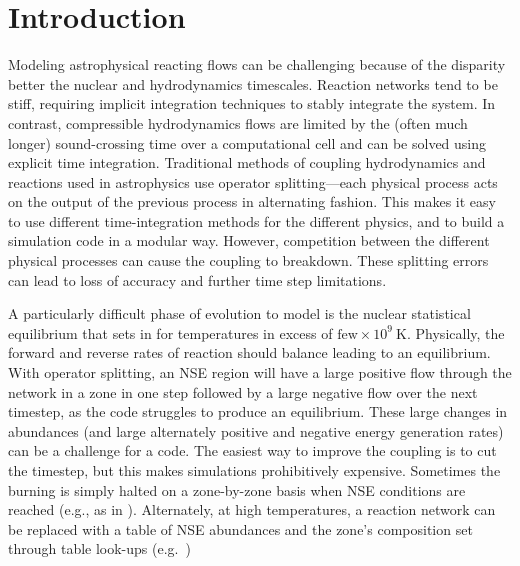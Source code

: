 \documentclass[times,modern]{aastex63}
\newcommand{\MarginPar}[1]{\marginpar{\vskip-\baselineskip\raggedright\tiny\sffamily\hrule\smallskip{\color{red}#1}\par\smallskip\hrule}}
\begin{document}
\section{Introduction}\label{Sec:Introduction}

Modeling astrophysical reacting flows can be challenging because of
the disparity better the nuclear and hydrodynamics timescales.
Reaction networks tend to be stiff, requiring implicit integration
techniques to stably integrate the system.  In contrast, compressible
hydrodynamics flows are limited by the (often much longer)
sound-crossing time over a computational cell and can be solved using
explicit time integration. Traditional methods of coupling
hydrodynamics and reactions used in astrophysics use operator
splitting---each physical process acts on the output of the previous
process in alternating fashion.  This makes it easy to use different
time-integration methods for the different physics, and to build a
simulation code in a modular way.  However, competition between the
different physical processes can cause the coupling to breakdown.
These splitting errors can lead to loss of accuracy and further time
step limitations.

A particularly difficult phase of evolution to model is the nuclear
statistical equilibrium that sets in for
temperatures in excess of $\mbox{few} \times 10^9~\mathrm{K}$.  Physically, the
forward and reverse rates of reaction should balance leading to an equilibrium.
With operator splitting, an NSE region will have a large positive flow
through the network in a zone in one step followed by a large negative
flow over the next timestep, as the code struggles to produce an
equilibrium.  These large changes in abundances (and large alternately
positive and negative energy generation rates) can be a challenge for
a code.  The easiest way to improve the coupling is to cut the
timestep, but this makes simulations prohibitively expensive.
Sometimes the burning is simply halted on a zone-by-zone basis when
NSE conditions are reached (e.g., as in \citealt{hedet}).
Alternately, at high temperatures, a reaction network can be replaced
with a table of NSE abundances and the zone's composition set through
table look-ups (e.g.\ \citealt{ma:2013}) \MarginPar{need more here}
\end{document}
